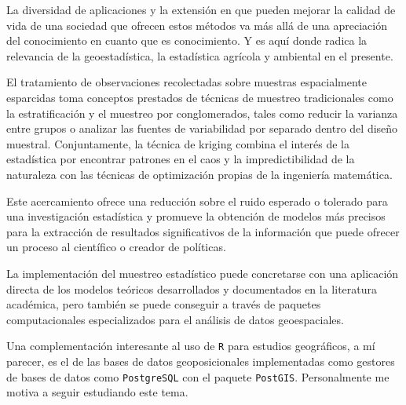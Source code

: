 \documentclass[14pt]{extarticle}
\begin{document}
La diversidad de aplicaciones y la extensión en que pueden mejorar la calidad de vida de una sociedad que ofrecen estos métodos va más allá de una apreciación del conocimiento en cuanto que es conocimiento. Y es aquí donde radica la relevancia de la geoestadística, la estadística agrícola y ambiental en el presente. 

El tratamiento de observaciones recolectadas sobre muestras espacialmente esparcidas toma conceptos prestados de técnicas de muestreo tradicionales como la estratificación y el muestreo por conglomerados, tales como reducir la varianza entre grupos o analizar las fuentes de variabilidad por separado dentro del diseño muestral. Conjuntamente, la técnica de kriging combina el interés de la estadística por encontrar patrones en el caos y la impredictibilidad de la naturaleza con las técnicas de optimización propias de la ingeniería matemática. 

Este acercamiento ofrece una reducción sobre el ruido esperado o tolerado para una investigación estadística y promueve la obtención de modelos más precisos para la extracción de resultados significativos de la información que puede ofrecer un proceso al científico o creador de políticas. 

La implementación del muestreo estadístico puede concretarse con una aplicación directa de los modelos teóricos desarrollados y documentados en la literatura académica, pero también se puede conseguir a través de paquetes computacionales especializados para el análisis de datos geoespaciales. 

Una complementación interesante al uso de \verb|R| para estudios geográficos, a mí parecer, es el de las bases de datos geoposicionales implementadas como gestores de bases de datos como \verb|PostgreSQL| con el paquete \verb|PostGIS|. Personalmente me motiva a seguir estudiando este tema. 
\newpage


\end{document}
